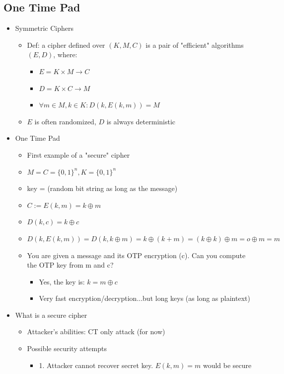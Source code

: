 \documentclass[]{article}
\begin{document}
\subsection{One Time Pad}
\begin{itemize}
	\item Symmetric Ciphers
	\begin{itemize}
		\item Def: a cipher defined over $(K, M, C)$ is a pair of "efficient" algorithms $(E,D)$, where:
		\begin{itemize}
			\item $E = K \times M \rightarrow C$
			\item $D = K \times C \rightarrow M$
			\item $\forall m \in M, k \in K: D(k, E(k,m)) = M $
		\end{itemize}
		\item $E$ is often randomized, $D$ is always deterministic
	\end{itemize}
	\item One Time Pad
	\begin{itemize}
		\item First example of a "secure" cipher
		\item $M = C = \{0,1\}^{n}, K = \{0,1\}^{n}$
		\item key = (random bit string as long as the message)
		\item $C := E(k,m) = k \oplus m$
		\item $D(k,c) = k \oplus c$
		\item $D(k, E(k,m)) = D(k, k \oplus m) = k \oplus (k+m) = (k \oplus k) \oplus m = o \oplus m = m$
		\item You are given a message and its OTP encryption (c). Can you compute the OTP key from m and c?
		\begin{itemize}
			\item Yes, the key is: \textbf{$k = m \oplus c$}
			\item Very fast encryption/decryption...but long keys (as long as plaintext)
		\end{itemize}
	\end{itemize}
	\item What is a secure cipher
	\begin{itemize}
		\item Attacker's abilities: CT only attack (for now)
		\item Possible security attempts
		\begin{itemize}
			\item 1. Attacker cannot recover secret key. $E(k,m) = m $ would be secure

\end{itemize}
\end{itemize}
\end{itemize}
\end{document}
